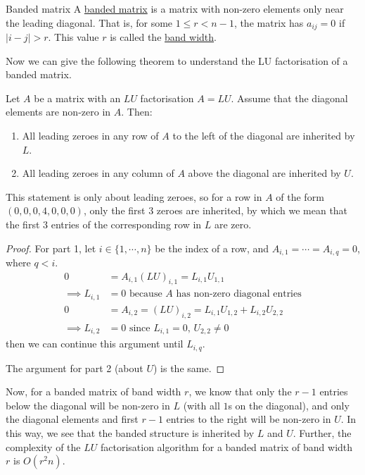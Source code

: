 \documentclass[../Main.tex]{subfiles}
\begin{document}
\begin{definition}{Banded matrix}
    A \underline{banded matrix} is a matrix with non-zero elements only near the leading diagonal. That is, for some $1 \leq r < n-1$, the matrix has $a_{ij} = 0$ if $|i - j| > r$. This value $r$ is called the \underline{band width}.
\end{definition}
Now we can give the following theorem to understand the LU factorisation of a banded matrix.
\begin{theorem}
    Let $A$ be a matrix with an $LU$ factorisation $A = LU$. Assume that the diagonal elements are non-zero in $A$. Then:
    \begin{enumerate}
        \item All leading zeroes in any row of $A$ to the left of the diagonal are inherited by $L$.
        \item All leading zeroes in any column of $A$ above the diagonal are inherited by $U$.
    \end{enumerate}
    \label{thmSparseLU}
\end{theorem}
\begin{remark}
    This statement is only about leading zeroes, so for a row in $A$ of the form $(0, 0, 0, 4, 0, 0, 0)$, only the first $3$ zeroes are inherited, by which we mean that the first $3$ entries of the corresponding row in $L$ are zero.
\end{remark}
\begin{proof}
    For part 1, let $i \in \{1, \cdots, n\}$ be the index of a row, and $A_{i, 1} = \cdots = A_{i,q} = 0$, where $q < i$.
    \begin{align*}
        0 &= A_{i,1} (LU)_{i,1} = L_{i,1} U_{1, 1} \\
        \implies L_{i,1} &= 0 \text{ because $A$ has non-zero diagonal entries} \\
        0 &= A_{i,2} = (LU)_{i,2} = L_{i,1} U_{1,2} + L_{i,2} U_{2,2} \\
        \implies L_{i,2} &= 0 \text{ since $L_{i,1} = 0$, $U_{2, 2} \neq 0$}
    \end{align*}
    then we can continue this argument until $L_{i,q}$.

    The argument for part 2 (about $U$) is the same.
\end{proof}
Now, for a banded matrix of band width $r$, we know that only the $r-1$ entries below the diagonal will be non-zero in $L$ (with all $1$s on the diagonal), and only the diagonal elements and first $r-1$ entries to the right will be non-zero in $U$. In this way, we see that the banded structure is inherited by $L$ and $U$. Further, the complexity of the $LU$ factorisation algorithm for a banded matrix of band width $r$ is $O(r^2n)$.
\end{document}
